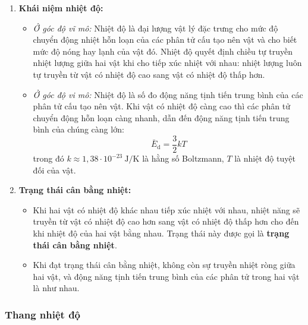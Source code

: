 \begin{kienthuc}
	\begin{enumerate}
		\item \textbf{Khái niệm nhiệt độ:}
		\begin{itemize}
			\item \textit{Ở góc độ vĩ mô:} Nhiệt độ là đại lượng vật lý đặc trưng cho mức độ chuyển động nhiệt hỗn loạn của các phân tử cấu tạo nên vật và cho biết mức độ nóng hay lạnh của vật đó. Nhiệt độ quyết định chiều tự truyền nhiệt lượng giữa hai vật khi cho tiếp xúc nhiệt với nhau: nhiệt lượng luôn tự truyền từ vật có nhiệt độ cao sang vật có nhiệt độ thấp hơn.
			\item \textit{Ở góc độ vi mô:} Nhiệt độ là số đo động năng tịnh tiến trung bình của các phân tử cấu tạo nên vật. Khi vật có nhiệt độ càng cao thì các phân tử chuyển động hỗn loạn càng nhanh, dẫn đến động năng tịnh tiến trung bình của chúng càng lớn:
			\[
			\bar{E}_{\mathrm{d}} = \dfrac{3}{2} k T
			\]
			trong đó $k \approx 1{,}38 \cdot 10^{-23}\ \mathrm{J/K}$ là hằng số Boltzmann, $T$ là nhiệt độ tuyệt đối của vật.
		\end{itemize}
		\item \textbf{Trạng thái cân bằng nhiệt:}
		\begin{itemize}
			\item Khi hai vật có nhiệt độ khác nhau tiếp xúc nhiệt với nhau, nhiệt năng sẽ truyền từ vật có nhiệt độ cao hơn sang vật có nhiệt độ thấp hơn cho đến khi nhiệt độ của hai vật bằng nhau. Trạng thái này được gọi là \textbf{trạng thái cân bằng nhiệt}.
			\item Khi đạt trạng thái cân bằng nhiệt, không còn sự truyền nhiệt ròng giữa hai vật, và động năng tịnh tiến trung bình của các phân tử trong hai vật là như nhau.
		\end{itemize}
	\end{enumerate}
\end{kienthuc}


\subsubsection{Thang nhiệt độ}

